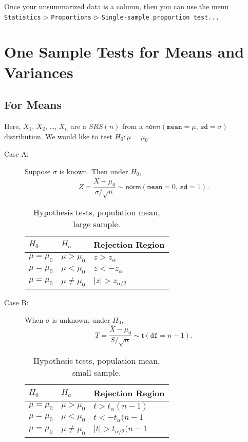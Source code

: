 Once your unsummarized data is a column, then you can use the menu
\texttt{Statistics} \(\triangleright\) \texttt{Proportions} \(\triangleright\)
\texttt{Single-sample proportion test...}

\section{One Sample Tests for Means and Variances}
\label{sec-10-3}

\subsection{For Means}
\label{sec-10-3-1}

Here, \(X_{1}\), \(X_{2}\), \ldots{}, \(X_{n}\) are a \(SRS(n)\) from a
\(\mathsf{norm}(\mathtt{mean} = \mu,\,\mathtt{sd} = \sigma)\)
distribution. We would like to test \(H_{0}:\mu = \mu_{0}\).

\begin{description}
\item[{Case A:}] Suppose \(\sigma\) is known. Then under \(H_{0}\),
\[
   Z = \frac{\overline{X} - \mu_{0}}{\sigma/\sqrt{n}} \sim \mathsf{norm}(\mathtt{mean} = 0,\,\mathtt{sd} = 1).
   \]

\begin{table}[htb]
\caption[Hypothesis tests, population mean, large sample]{\label{tab-ztest-one-sample}Hypothesis tests, population mean, large sample.}
\centering
\begin{tabular}{lll}
\(H_{0}\) & \(H_{a}\) & Rejection Region\\
\hline
\(\mu = \mu_{0}\) & \(\mu > \mu_{0}\) & \(z > z_{\alpha}\)\\
\(\mu = \mu_{0}\) & \(\mu < \mu_{0}\) & \(z < -z_{\alpha}\)\\
\(\mu = \mu_{0}\) & \(\mu \neq \mu_{0}\) & \( \vert z \vert > z_{\alpha/2}\)\\
\end{tabular}
\end{table}

\item[{Case B:}] When \(\sigma\) is unknown, under \(H_{0}\),
\[
   T = \frac{\overline{X} - \mu_{0}}{S/\sqrt{n}} \sim \mathsf{t}(\mathtt{df} = n - 1).
   \]
\begin{table}[htb]
\caption[Hypothesis tests, population mean, small sample]{\label{tab-ttest-one-sample}Hypothesis tests, population mean, small sample.}
\centering
\begin{tabular}{lll}
\(H_{0}\) & \(H_{a}\) & Rejection Region\\
\hline
\(\mu = \mu_{0}\) & \(\mu > \mu_{0}\) & \(t > t_{\alpha}(n - 1)\)\\
\(\mu = \mu_{0}\) & \(\mu < \mu_{0}\) & \(t < -t_{\alpha}(n - 1\)\\
\(\mu = \mu_{0}\) & \(\mu \neq \mu_{0}\) & \( \vert t \vert > t_{\alpha/2}(n - 1\)\\
\end{tabular}
\end{table}
\end{description}

